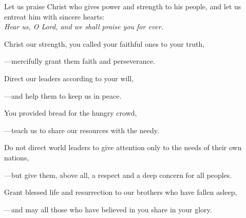 \intercessions\indent

\begin{hangpar}

Let us praise Christ who gives power and strength to his people, and let us entreat him with sincere hearts:\\
\emph{Hear us, O Lord, and we shall praise you for ever.}

\medskip Christ our strength, you called your faithful ones to your truth,

{\color{red}---\thinspace}mercifully grant them faith and perseverance.

\medskip Direct our leaders according to your will,

{\color{red}---\thinspace}and help them to keep us in peace.

\medskip You provided bread for the hungry crowd,

{\color{red}---\thinspace}teach us to share our resources with the needy.

\medskip Do not direct world leaders to give attention only to the needs of their own nations,

{\color{red}---\thinspace}but give them, above all, a respect and a deep concern for all peoples.

\medskip Grant blessed life and resurrection to our brothers who have fallen asleep,

{\color{red}---\thinspace}and may all those who have believed in you share in your glory.

\end{hangpar}

